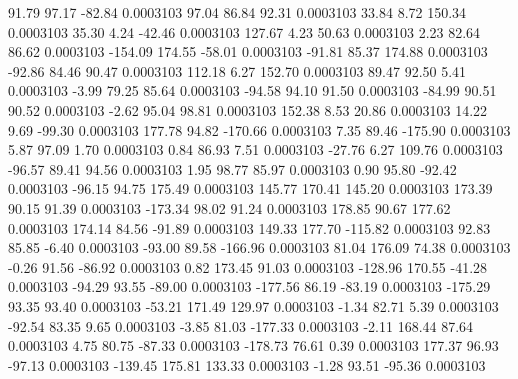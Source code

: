        91.79       97.17      -82.84     0.0003103
       97.04       86.84       92.31     0.0003103
       33.84        8.72      150.34     0.0003103
       35.30        4.24      -42.46     0.0003103
      127.67        4.23       50.63     0.0003103
        2.23       82.64       86.62     0.0003103
     -154.09      174.55      -58.01     0.0003103
      -91.81       85.37      174.88     0.0003103
      -92.86       84.46       90.47     0.0003103
      112.18        6.27      152.70     0.0003103
       89.47       92.50        5.41     0.0003103
       -3.99       79.25       85.64     0.0003103
      -94.58       94.10       91.50     0.0003103
      -84.99       90.51       90.52     0.0003103
       -2.62       95.04       98.81     0.0003103
      152.38        8.53       20.86     0.0003103
       14.22        9.69      -99.30     0.0003103
      177.78       94.82     -170.66     0.0003103
        7.35       89.46     -175.90     0.0003103
        5.87       97.09        1.70     0.0003103
        0.84       86.93        7.51     0.0003103
      -27.76        6.27      109.76     0.0003103
      -96.57       89.41       94.56     0.0003103
        1.95       98.77       85.97     0.0003103
        0.90       95.80      -92.42     0.0003103
      -96.15       94.75      175.49     0.0003103
      145.77      170.41      145.20     0.0003103
      173.39       90.15       91.39     0.0003103
     -173.34       98.02       91.24     0.0003103
      178.85       90.67      177.62     0.0003103
      174.14       84.56      -91.89     0.0003103
      149.33      177.70     -115.82     0.0003103
       92.83       85.85       -6.40     0.0003103
      -93.00       89.58     -166.96     0.0003103
       81.04      176.09       74.38     0.0003103
       -0.26       91.56      -86.92     0.0003103
        0.82      173.45       91.03     0.0003103
     -128.96      170.55      -41.28     0.0003103
      -94.29       93.55      -89.00     0.0003103
     -177.56       86.19      -83.19     0.0003103
     -175.29       93.35       93.40     0.0003103
      -53.21      171.49      129.97     0.0003103
       -1.34       82.71        5.39     0.0003103
      -92.54       83.35        9.65     0.0003103
       -3.85       81.03     -177.33     0.0003103
       -2.11      168.44       87.64     0.0003103
        4.75       80.75      -87.33     0.0003103
     -178.73       76.61        0.39     0.0003103
      177.37       96.93      -97.13     0.0003103
     -139.45      175.81      133.33     0.0003103
       -1.28       93.51      -95.36     0.0003103
